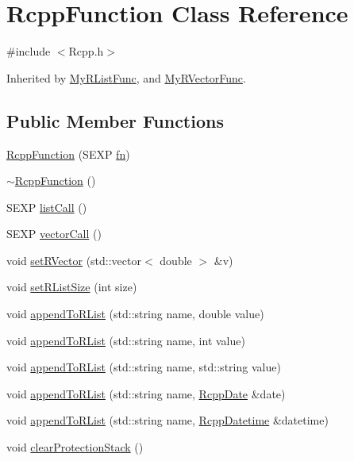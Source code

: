\hypertarget{classRcppFunction}{
\section{RcppFunction Class Reference}
\label{classRcppFunction}
}


{\ttfamily \#include $<$Rcpp.h$>$}

Inherited by \hyperlink{classMyRListFunc}{MyRListFunc}, and \hyperlink{classMyRVectorFunc}{MyRVectorFunc}.\subsection*{Public Member Functions}
\begin{DoxyCompactItemize}
\item 
\hyperlink{classRcppFunction_a6fc6fca8d052170d86240c784f54261a}{RcppFunction} (SEXP \hyperlink{classRcppFunction_aa6b5966224b8b7d158be6cdfc3612063}{fn})
\item 
\hyperlink{classRcppFunction_ae155cf5dd33cb110e9a89a59c7bff6e9}{$\sim$RcppFunction} ()
\item 
SEXP \hyperlink{classRcppFunction_a0cc9d29ab7db552494dddefaa78e6578}{listCall} ()
\item 
SEXP \hyperlink{classRcppFunction_ac57c514c761609892ff553434e134446}{vectorCall} ()
\item 
void \hyperlink{classRcppFunction_a482df5aa5e2a98d52c9a79cf3ab31c67}{setRVector} (std::vector$<$ double $>$ \&v)
\item 
void \hyperlink{classRcppFunction_af3dbcf8dcfbdfc49ef566b5efd0ad978}{setRListSize} (int size)
\item 
void \hyperlink{classRcppFunction_a0df1a8ff093e21a2a7c6fc80d6645c7e}{appendToRList} (std::string name, double value)
\item 
void \hyperlink{classRcppFunction_afce449ac5d89b32e0e0b9f584278a672}{appendToRList} (std::string name, int value)
\item 
void \hyperlink{classRcppFunction_a861ba7ae5c09acf31a034472b5a47728}{appendToRList} (std::string name, std::string value)
\item 
void \hyperlink{classRcppFunction_a9aab0b3accb81d90fb813acf3bf4c49d}{appendToRList} (std::string name, \hyperlink{classRcppDate}{RcppDate} \&date)
\item 
void \hyperlink{classRcppFunction_a0be4ab064287c2d3a5c3b883a1707d70}{appendToRList} (std::string name, \hyperlink{classRcppDatetime}{RcppDatetime} \&datetime)
\item 
void \hyperlink{classRcppFunction_a689c914636f0f0e86b90da4425c6e6a3}{clearProtectionStack} ()
\end{DoxyCompactItemize}
